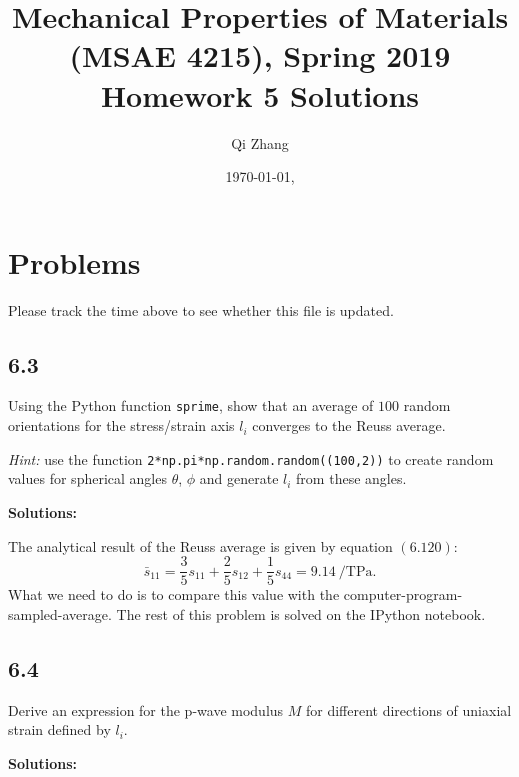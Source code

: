 \documentclass[12pt]{article}
\begin{document}

\title{Mechanical Properties of Materials (MSAE 4215), Spring 2019\\ Homework 5 Solutions}
\author{Qi Zhang}
\date{\today, \currenttime}

\maketitle

\tableofcontents
\listoftables

\section{Problems}
Please track the time above to see whether this file is updated.

\subsection{6.3}
Using the Python function \texttt{sprime}, show that an average of $100$
random orientations for the stress/strain axis $l_i$ converges to the Reuss average.

\textit{Hint:} use the function
\texttt{2*np.pi*np.random.random((100,2))} to create random
values for spherical angles $\theta$, $\phi$ and generate $l_i$ from these angles.

\textbf{Solutions:}

The analytical result of the Reuss average is given by equation $(6.120)$:
\begin{equation}
  \bar{s}_{11} = \frac{ 3 }{ 5 } s_{11} + \frac{ 2 }{ 5 } s_{12} + \frac{ 1 }{ 5 } s_{44}
  = \SI{9.14}{\per\tera\pascal}.
\end{equation}
What we need to do is to compare this value with the computer-program-sampled-average.
The rest of this problem is solved on the IPython notebook.


\subsection{6.4}\label{ssec:64}
Derive an expression for the p-wave modulus $M$ for different directions
of uniaxial strain defined by $l_i$.

\textbf{Solutions:}
\end{document}
